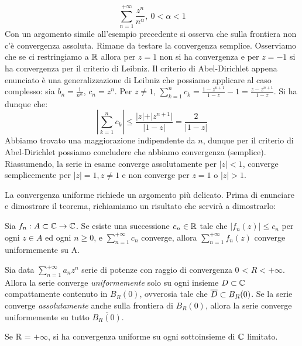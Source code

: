 \documentclass[Completo.tex]{subfiles}
\begin{document}
\begin{Ex}
	\begin{equation*}
		\sum\limits_{n=1}^{+\infty} \frac{z^n}{n^{\alpha}}, \ 0 < \alpha < 1
	\end{equation*}
	Con un argomento simile all'esempio precedente si osserva che sulla frontiera non c'è convergenza assoluta. Rimane da testare la convergenza semplice. Osserviamo che se ci restringiamo a $\bb[R]$ allora per $z = 1$ non si ha convergenza e per $z = -1$ si ha convergenza per il criterio di Leibniz. Il criterio di Abel-Dirichlet appena enunciato è una generalizzazione di Leibniz che possiamo applicare al caso complesso: sia $b_n = \frac{1}{n^{\alpha}}$, $c_n = z^n$. Per $z \neq 1$, $\sum_{k = 1}^{n} c_k = \frac{1-z^{n+1}}{1-z} -1 = \frac{z-z^{n+1}}{1-z}$. Si ha dunque che:
	\begin{equation*}
	\left\vert \sum_{k = 1}^{n} c_k \right\vert \leq \frac{\vert z \vert + \vert z^{n+1} \vert}{\vert 1-z \vert} = \frac{2}{\vert 1-z \vert}
	\end{equation*}
	Abbiamo trovato una maggiorazione indipendente da $n$, dunque per il criterio di Abel-Dirichlet possiamo concludere che abbiamo convergenza (semplice). \\
	Riassumendo, la serie in esame converge assolutamente per $\vert z \vert < 1$, converge semplicemente per $\vert z \vert = 1, z \neq 1$ e non converge per $z = 1$ o $\vert z \vert > 1$.
\end{Ex}
La convergenza uniforme richiede un argomento più delicato. Prima di enunciare e dimostrare il teorema, richiamiamo un risultato che servirà a dimostrarlo:
\begin{Lemma}
	Sia $f_n: A \sset \bb[C] \ra \bb[C]$. Se esiste una successione $c_n \in \bb[R]$ tale che $\vert f_n(z) \vert \leq c_n$ per ogni $z \in A$ ed ogni $n \geq 0$, e $\sum_{n = 1}^{+\infty} c_n$ converge, allora $\sum_{n=1}^{+\infty} f_n(z)$ converge uniformemente su A.
\end{Lemma}
\begin{eTh}
	Sia data $\sum_{n=1}^{+\infty} a_n z^n$ serie di potenze con raggio di convergenza 0 < $R < +\infty$. Allora la serie converge \textit{uniformemente} solo su ogni insieme $D \sset \bb[C]$ compattamente contenuto in $B_R(0)$, ovverosia tale che $\overline{D} \subset B_R(0)$. Se la serie converge \textit{assolutamente} anche sulla frontiera di $B_R(0)$, allora la serie converge uniformemente su tutto $\overline{B_R(0)}$.
\end{eTh}
\begin{Oss}
	Se R = $+\infty$, si ha convergenza uniforme su ogni sottoinsieme di $\bb[C]$ limitato.
\end{Oss}
\end{document}
